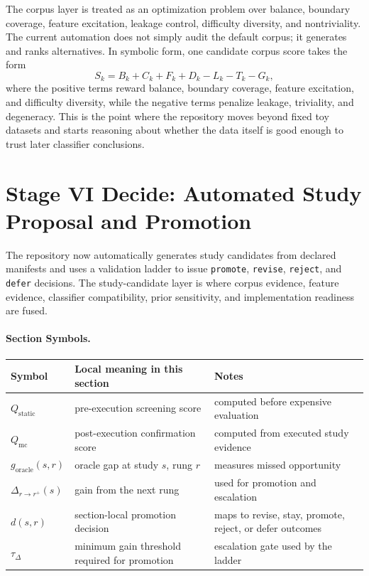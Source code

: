 \documentclass[11pt]{article}
\newcommand{\sectionsymbol}[3]{#1 & #2 & #3 \\}
\newcommand{\sectionsymbols}[1]{%
\begin{center}
\small
\setlength{\tabcolsep}{4pt}
\begin{tabularx}{0.95\textwidth}{>{\raggedright\arraybackslash}p{0.16\textwidth}X>{\raggedright\arraybackslash}p{0.18\textwidth}}
\toprule
Symbol & Local meaning in this section & Notes \\
\midrule
#1
\bottomrule
\end{tabularx}
\end{center}
}
\begin{document}
\noindent
The corpus layer is treated as an optimization problem over balance, boundary coverage, feature excitation, leakage control, difficulty diversity, and nontriviality. The current automation does not simply audit the default corpus; it generates and ranks alternatives.
In symbolic form, one candidate corpus score takes the form
\begin{equation}
S_k = B_k + C_k + F_k + D_k - L_k - T_k - G_k,
\end{equation}
where the positive terms reward balance, boundary coverage, feature excitation, and difficulty diversity, while the negative terms penalize leakage, triviality, and degeneracy. This is the point where the repository moves beyond fixed toy datasets and starts reasoning about whether the data itself is good enough to trust later classifier conclusions.


\section{Stage VI Decide: Automated Study Proposal and Promotion}
The repository now automatically generates study candidates from declared manifests and uses a validation ladder to issue \texttt{promote}, \texttt{revise}, \texttt{reject}, and \texttt{defer} decisions. The study-candidate layer is where corpus evidence, feature evidence, classifier compatibility, prior sensitivity, and implementation readiness are fused.
\paragraph{Section Symbols.}
\sectionsymbols{
\sectionsymbol{\(Q_{\text{static}}\)}{pre-execution screening score}{computed before expensive evaluation}
\sectionsymbol{\(Q_{\text{mc}}\)}{post-execution confirmation score}{computed from executed study evidence}
\sectionsymbol{\(g_{\text{oracle}}(s,r)\)}{oracle gap at study \(s\), rung \(r\)}{measures missed opportunity}
\sectionsymbol{\(\Delta_{r \rightarrow r^+}(s)\)}{gain from the next rung}{used for promotion and escalation}
\sectionsymbol{\(d(s,r)\)}{section-local promotion decision}{maps to revise, stay, promote, reject, or defer outcomes}
\sectionsymbol{\(\tau_{\Delta}\)}{minimum gain threshold required for promotion}{escalation gate used by the ladder}
}
\end{document}
